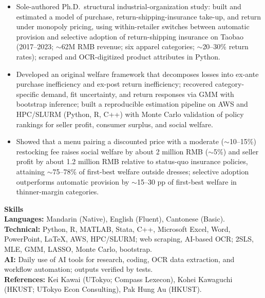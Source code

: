 \documentclass[11pt,letterpaper]{article}
\begin{document}
\begin{itemize}
  \item Sole-authored Ph.D.\ structural industrial-organization study: built and estimated a model of purchase, return-shipping-insurance take-up, and return under monopoly pricing, using within-retailer switches between automatic provision and selective adoption of return-shipping insurance on Taobao (2017--2023; \(\sim\)62M RMB revenue; six apparel categories; \(\sim\)20--30\% return rates); scraped and OCR-digitized product attributes in Python.
  \item Developed an original welfare framework that decomposes losses into ex-ante purchase inefficiency and ex-post return inefficiency; recovered category-specific demand, fit uncertainty, and return responses via GMM with bootstrap inference; built a reproducible estimation pipeline on AWS and HPC/SLURM (Python, R, C++) with Monte Carlo validation of policy rankings for seller profit, consumer surplus, and social welfare.
  \item Showed that a menu pairing a discounted price with a moderate (\(\sim\)10--15\%) restocking fee raises social welfare by about 2 million RMB (\(\sim\)5\%) and seller profit by about 1.2 million RMB relative to status-quo insurance policies, attaining \(\sim\)75--78\% of first-best welfare outside dresses; selective adoption outperforms automatic provision by \(\sim\)15--30 pp of first-best welfare in thinner-margin categories.
\end{itemize}

\vspace{0.15pt}

{\large \textbf{Skills}}\\[-0.5pt]
\textbf{Languages:} Mandarin (Native), English (Fluent), Cantonese (Basic).\\
\textbf{Technical:} Python, R, MATLAB, Stata, C++, Microsoft Excel, Word, PowerPoint, \LaTeX, AWS, HPC/SLURM; web scraping, AI-based OCR; 2SLS, MLE, GMM, LASSO, Monte Carlo, bootstrap.\\
\textbf{AI:} Daily use of AI tools for research, coding, OCR data extraction, and workflow automation; outputs verified by tests.\\
\textbf{References:} Kei Kawai (UTokyo; Compass Lexecon), Kohei Kawaguchi (HKUST; UTokyo Econ Consulting), Pak Hung Au (HKUST).
\end{document}
